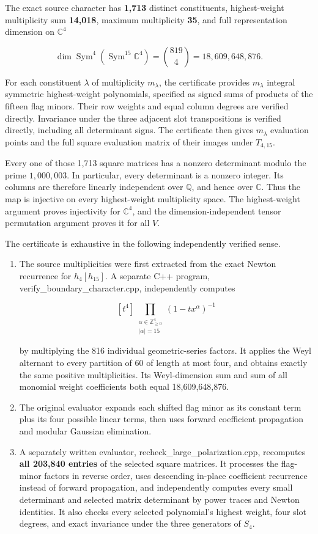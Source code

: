 \documentclass[
  10pt,
]{article}
\begin{document}
The exact source character has \textbf{1,713} distinct constituents,
highest-weight multiplicity sum \textbf{14,018}, maximum multiplicity
\textbf{35}, and full representation dimension on \(\mathbb C^4\)

\[
 \dim\operatorname{Sym}^4(\operatorname{Sym}^{15}\mathbb C^4)
 =\binom{819}{4}=18,609,648,876.
\]

For each constituent \(\lambda\) of multiplicity \(m_\lambda\), the
certificate provides \(m_\lambda\) integral symmetric highest-weight
polynomials, specified as signed sums of products of the fifteen flag
minors. Their row weights and equal column degrees are verified
directly. Invariance under the three adjacent slot transpositions is
verified directly, including all determinant signs. The certificate then
gives \(m_\lambda\) evaluation points and the full square evaluation
matrix of their images under \(T_{4,15}\).

Every one of those 1,713 square matrices has a nonzero determinant
modulo the prime \(1,000,003\). In particular, every determinant is a
nonzero integer. Its columns are therefore linearly independent over
\(\mathbb Q\), and hence over \(\mathbb C\). Thus the map is injective
on every highest-weight multiplicity space. The highest-weight argument
proves injectivity for \(\mathbb C^4\), and the dimension-independent
tensor permutation argument proves it for all \(V\).

The certificate is exhaustive in the following independently verified
sense.

\begin{enumerate}
\def\labelenumi{\arabic{enumi}.}
\item
  The source multiplicities were first extracted from the exact Newton
  recurrence for \(h_4[h_{15}]\). A separate C++ program,
  verify\_boundary\_character.cpp, independently computes

  \[
  [t^4]\prod_{\substack{\alpha\in\mathbb Z_{\ge0}^4\\|\alpha|=15}}
  (1-tx^\alpha)^{-1}
  \]

  by multiplying the 816 individual geometric-series factors. It applies
  the Weyl alternant to every partition of 60 of length at most four,
  and obtains exactly the same positive multiplicities. Its
  Weyl-dimension sum and sum of all monomial weight coefficients both
  equal 18,609,648,876.
\item
  The original evaluator expands each shifted flag minor as its constant
  term plus its four possible linear terms, then uses forward
  coefficient propagation and modular Gaussian elimination.
\item
  A separately written evaluator, recheck\_large\_polarization.cpp,
  recomputes \textbf{all 203,840 entries} of the selected square
  matrices. It processes the flag-minor factors in reverse order, uses
  descending in-place coefficient recurrence instead of forward
  propagation, and independently computes every small determinant and
  selected matrix determinant by power traces and Newton identities. It
  also checks every selected polynomial's highest weight, four slot
  degrees, and exact invariance under the three generators of \(S_4\).
\end{enumerate}
\end{document}
